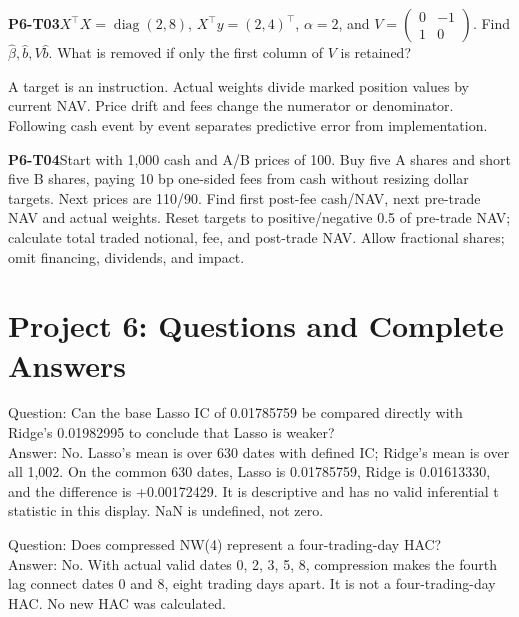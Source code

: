\begin{yourturn}\textbf{P6-T03}\quad $X^\top X=\operatorname{diag}(2,8)$, $X^\top y=(2,4)^\top $, $\alpha=2$, and $V=\begin{pmatrix}0&-1\\1&0\end{pmatrix}$. Find $\hat\beta,\hat b,V\hat b $. What is removed if only the first column of $V $ is retained?\workspace[4]\end{yourturn}
\clearpage
\begin{strand}
A target is an instruction. Actual weights divide marked position values by current NAV. Price drift and fees change the numerator or denominator. Following cash event by event separates predictive error from implementation.
\end{strand}
\begin{yourturn}\textbf{P6-T04}\quad Start with 1,000 cash and A/B prices of 100. Buy five A shares and short five B shares, paying 10 bp one-sided fees from cash without resizing dollar targets. Next prices are 110/90. Find first post-fee cash/NAV, next pre-trade NAV and actual weights. Reset targets to positive/negative 0.5 of pre-trade NAV; calculate total traded notional, fee, and post-trade NAV. Allow fractional shares; omit financing, dividends, and impact.\workspace[6]\end{yourturn}

\clearpage\section*{Project 6: Questions and Complete Answers}
\color{inkiron}
Question: Can the base Lasso IC of 0.01785759 be compared directly with Ridge's 0.01982995 to conclude that Lasso is weaker?\\
Answer: No. Lasso's mean is over 630 dates with defined IC; Ridge's mean is over all 1,002. On the common 630 dates, Lasso is 0.01785759, Ridge is 0.01613330, and the difference is +0.00172429. It is descriptive and has no valid inferential t statistic in this display. NaN is undefined, not zero.

\clearpage
{}
Question: Does compressed NW(4) represent a four-trading-day HAC?\\
Answer: No. With actual valid dates 0, 2, 3, 5, 8, compression makes the fourth lag connect dates 0 and 8, eight trading days apart. It is not a four-trading-day HAC. No new HAC was calculated.

